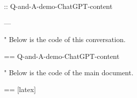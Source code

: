 \documentclass[%
  use theme = ChatGPT-light,
  scroll,
]{Q-and-A}
\begin{document}
:: {Q-and-A-demo-ChatGPT-content}

---

"
  Below is the code of this conversation.

  == {Q-and-A-demo-ChatGPT-content}

"
  Below is the code of the main document.

  == [latex] {\jobname}
\end{document}
